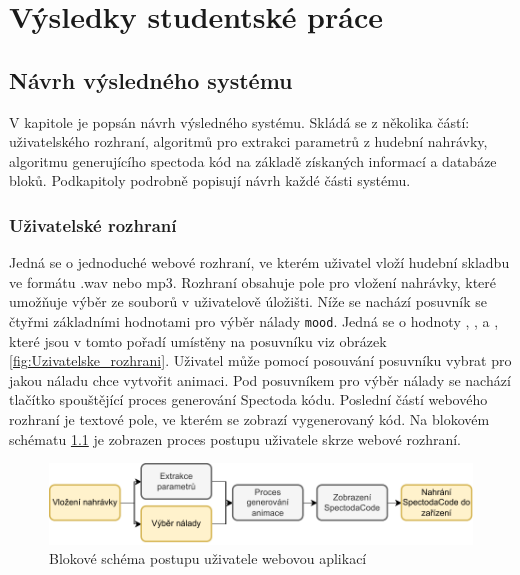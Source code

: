 \chapter{Výsledky studentské práce}




\section{Návrh výsledného systému} \label{sec:Navrh_systemu}

V kapitole je popsán návrh výsledného systému. Skládá se z několika částí: uživatelského rozhraní, algoritmů pro extrakci parametrů z hudební nahrávky, algoritmu generujícího spectoda kód na základě získaných informací a databáze bloků. Podkapitoly podrobně popisují návrh každé části systému.

\subsection{Uživatelské rozhraní} \label{sec:User_interface}

Jedná se o jednoduché webové rozhraní, ve kterém uživatel vloží hudební skladbu ve formátu .wav nebo mp3. Rozhraní obsahuje pole pro vložení nahrávky, které umožňuje výběr ze souborů v uživatelově úložišti. Níže se nachází posuvník se čtyřmi základními hodnotami pro výběr nálady
\texttt{mood}. Jedná se o hodnoty , ,  a , které jsou v tomto pořadí umístěny na posuvníku viz obrázek \ref{fig:Uzivatelske_rozhrani}. Uživatel může pomocí posouvání posuvníku vybrat pro jakou náladu chce vytvořit animaci. Pod posuvníkem pro výběr nálady se nachází tlačítko spouštějící proces generování Spectoda kódu.
Poslední částí webového rozhraní je textové pole, ve kterém se zobrazí vygenerovaný kód. Na blokovém schématu \ref{fig:User_interaction_diagram} je zobrazen proces postupu uživatele skrze webové rozhraní. 

 \begin{figure}[H]
    \centering
    \includegraphics[width = 1\linewidth]{obrazky/User_interaction_diagram.pdf}
    \caption{Blokové schéma postupu uživatele webovou aplikací}
    \label{fig:User_interaction_diagram}
\end{figure}

